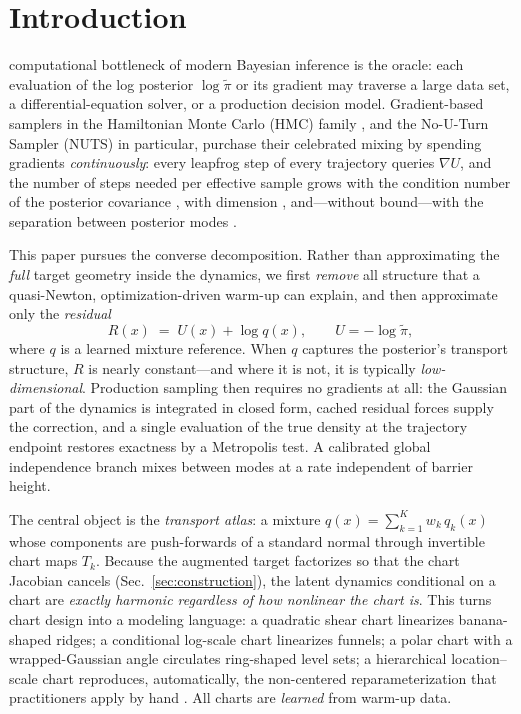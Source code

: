 \documentclass[10pt,journal,compsoc]{IEEEtran}
\begin{document}
\maketitle
\IEEEdisplaynontitleabstractindextext
\IEEEpeerreviewmaketitle

\section{Introduction}
 computational bottleneck of modern Bayesian inference is
the oracle: each evaluation of the log posterior $\log\tilde\pi$ or its
gradient may traverse a large data set, a differential-equation solver, or a
production decision model. Gradient-based samplers in the Hamiltonian Monte
Carlo (HMC) family \cite{duane1987,neal2011}, and the No-U-Turn Sampler
(NUTS) \cite{hoffman2014} in particular, purchase their celebrated mixing by
spending gradients \emph{continuously}: every leapfrog step of every
trajectory queries $\nabla U$, and the number of steps needed per effective
sample grows with the condition number of the posterior covariance
\cite{neal2011,beskos2013}, with dimension \cite{beskos2013}, and---without
bound---with the separation between posterior modes \cite{mangoubi2018}.

This paper pursues the converse decomposition. Rather than approximating the
\emph{full} target geometry inside the dynamics, we first \emph{remove} all
structure that a quasi-Newton, optimization-driven warm-up can explain, and
then approximate only the \emph{residual}
\begin{equation}
R(x) \;=\; U(x) + \log q(x), \qquad U=-\log\tilde\pi,
\label{eq:residual}
\end{equation}
where $q$ is a learned mixture reference. When $q$ captures the posterior's
transport structure, $R$ is nearly constant---and where it is not, it is
typically \emph{low-dimensional}. Production sampling then requires no
gradients at all: the Gaussian part of the dynamics is integrated in closed
form, cached residual forces supply the correction, and a single evaluation
of the true density at the trajectory endpoint restores exactness by a
Metropolis test. A calibrated global independence branch mixes between modes
at a rate independent of barrier height.

The central object is the \emph{transport atlas}: a mixture
$q(x)=\sum_{k=1}^K w_k\,q_k(x)$ whose components are push-forwards of a
standard normal through invertible chart maps $T_k$. Because the augmented
target factorizes so that the chart Jacobian cancels
(Sec.~\ref{sec:construction}), the latent dynamics conditional on a chart are
\emph{exactly harmonic regardless of how nonlinear the chart is}. This turns
chart design into a modeling language: a quadratic shear chart linearizes
banana-shaped ridges; a conditional log-scale chart linearizes funnels; a
polar chart with a wrapped-Gaussian angle circulates ring-shaped level sets;
a hierarchical location--scale chart reproduces, automatically, the
non-centered reparameterization that practitioners apply by hand
\cite{papaspiliopoulos2007,betancourt2015}. All charts are \emph{learned}
from warm-up data.
\end{document}
